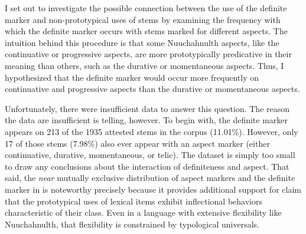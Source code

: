 I set out to investigate the possible connection between the use of the definite marker and non-prototypical uses of stems by examining the frequency with which the definite marker occurs with stems marked for different aspects.  The intuition behind this procedure is that some Nuuchahnulth aspects, like the continuative or progressive aspects, are more prototypically predicative in their meaning than others, such as the durative or momentaneous aspects. Thus, I hypothesized that the definite marker would occur more frequently on continuative and progressive aspects than the durative or momentaneous aspects.

Unfortunately, there were insufficient data to answer this question. The reason the data are insufficient is telling, however. To begin with, the definite marker appears on 213 of the 1935 attested stems in the corpus (11.01\%). However, only 17 of those stems (7.98\%) also ever appear with an aspect marker (either continuative, durative, momentaneous, or telic). The dataset is simply too small to draw any conclusions about the interaction of definiteness and aspect. That said, the \emph{near} mutually exclusive distribution of aspect markers and the definite marker in  is noteworthy precisely because it provides additional support for  claim that the prototypical uses of lexical items exhibit inflectional behaviors characteristic of their class. Even in a language with extensive flexibility like Nuuchahnulth, that flexibility is constrained by typological universals.
